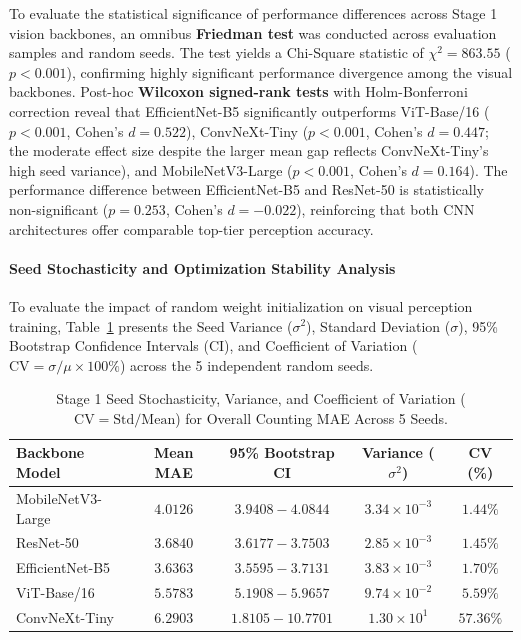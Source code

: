 \documentclass[preprint,12pt]{elsarticle}
\begin{document}
To evaluate the statistical significance of performance differences across Stage 1 vision backbones, an omnibus \textbf{Friedman test} was conducted across evaluation samples and random seeds. The test yields a Chi-Square statistic of $\chi^2 = 863.55$ ($p < 0.001$), confirming highly significant performance divergence among the visual backbones. Post-hoc \textbf{Wilcoxon signed-rank tests} with Holm-Bonferroni correction reveal that EfficientNet-B5 significantly outperforms ViT-Base/16 ($p < 0.001$, Cohen's $d = 0.522$), ConvNeXt-Tiny ($p < 0.001$, Cohen's $d = 0.447$; the moderate effect size despite the larger mean gap reflects ConvNeXt-Tiny's high seed variance), and MobileNetV3-Large ($p < 0.001$, Cohen's $d = 0.164$). The performance difference between EfficientNet-B5 and ResNet-50 is statistically non-significant ($p = 0.253$, Cohen's $d = -0.022$), reinforcing that both CNN architectures offer comparable top-tier perception accuracy.


\paragraph{Seed Stochasticity and Optimization Stability Analysis}
To evaluate the impact of random weight initialization on visual perception training, Table~\ref{tab:stage1_seed_variance} presents the Seed Variance ($\sigma^2$), Standard Deviation ($\sigma$), 95\% Bootstrap Confidence Intervals (CI), and Coefficient of Variation ($\text{CV} = \sigma / \mu \times 100\%$) across the 5 independent random seeds.

\begin{table}[h]
\centering
\footnotesize
\setlength{\tabcolsep}{4pt}
\renewcommand{\arraystretch}{1.1}
\caption{Stage 1 Seed Stochasticity, Variance, and Coefficient of Variation ($\text{CV} = \text{Std} / \text{Mean}$) for Overall Counting MAE Across 5 Seeds.}
\label{tab:stage1_seed_variance}
\begin{tabular}{lcccc}
\toprule
\textbf{Backbone Model} & \textbf{Mean MAE} & \textbf{95\% Bootstrap CI} & \textbf{Variance ($\sigma^2$)} & \textbf{CV (\%)} \\
\midrule
MobileNetV3-Large \citep{mobilenet} & $4.0126$ & $3.9408 - 4.0844$ & $3.34 \times 10^{-3}$ & $\mathbf{1.44\%}$ \\
ResNet-50 \citep{resnet} & $3.6840$ & $3.6177 - 3.7503$ & $2.85 \times 10^{-3}$ & $1.45\%$ \\
EfficientNet-B5 \citep{efficientnet} & $\mathbf{3.6363}$ & $\mathbf{3.5595 - 3.7131}$ & $3.83 \times 10^{-3}$ & $1.70\%$ \\
ViT-Base/16 \citep{vit} & $5.5783$ & $5.1908 - 5.9657$ & $9.74 \times 10^{-2}$ & $5.59\%$ \\
ConvNeXt-Tiny \citep{convnext} & $6.2903$ & $1.8105 - 10.7701$ & $1.30 \times 10^{1}$ & $57.36\%$ \\
\bottomrule
\end{tabular}%
\end{table}
\end{document}
